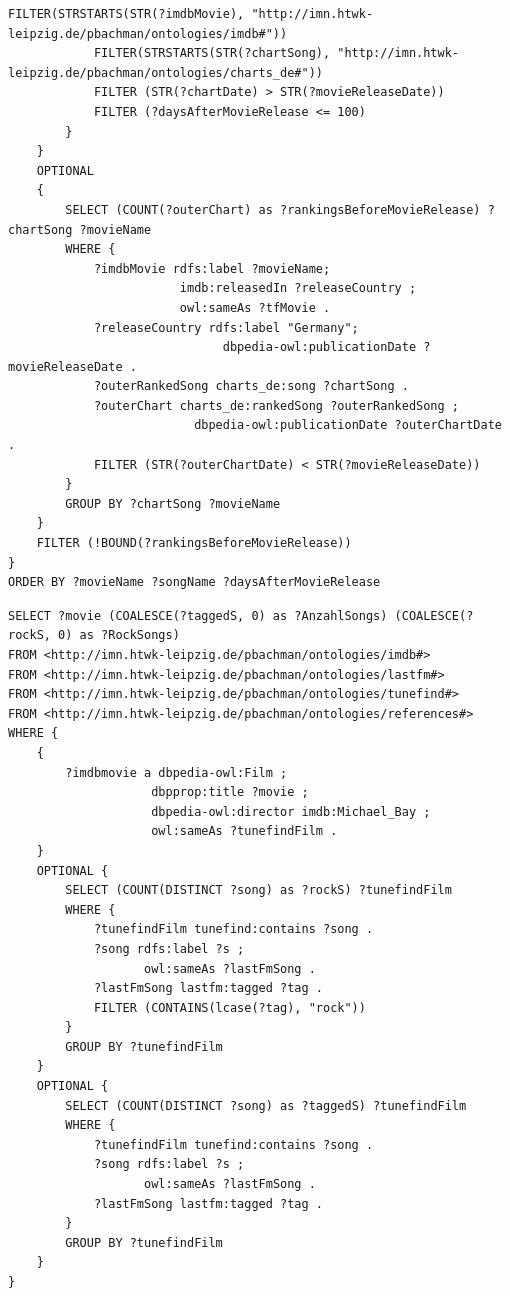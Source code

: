 \documentclass[parskip]{scrartcl}
\begin{document}
\begin{lstlisting}[caption={SPARQL-Anfrage zur Beantwortung der Recherchefragestellung}, label={lst:questionSparql}]
            FILTER(STRSTARTS(STR(?imdbMovie), "http://imn.htwk-leipzig.de/pbachman/ontologies/imdb#"))
            FILTER(STRSTARTS(STR(?chartSong), "http://imn.htwk-leipzig.de/pbachman/ontologies/charts_de#"))
            FILTER (STR(?chartDate) > STR(?movieReleaseDate))
            FILTER (?daysAfterMovieRelease <= 100)
        }
    }
    OPTIONAL 
    {
        SELECT (COUNT(?outerChart) as ?rankingsBeforeMovieRelease) ?chartSong ?movieName
        WHERE {           
            ?imdbMovie rdfs:label ?movieName;
                        imdb:releasedIn ?releaseCountry ;
                        owl:sameAs ?tfMovie .
            ?releaseCountry rdfs:label "Germany";
                              dbpedia-owl:publicationDate ?movieReleaseDate .
            ?outerRankedSong charts_de:song ?chartSong .
            ?outerChart charts_de:rankedSong ?outerRankedSong ;
                          dbpedia-owl:publicationDate ?outerChartDate .
            FILTER (STR(?outerChartDate) < STR(?movieReleaseDate))
        }
        GROUP BY ?chartSong ?movieName
    }
    FILTER (!BOUND(?rankingsBeforeMovieRelease))
}
ORDER BY ?movieName ?songName ?daysAfterMovieRelease
\end{lstlisting}


\begin{lstlisting}[caption={SPARQL-Anfrage zur Beantwortung der alternativen Recherchefragestellung}, label={lst:questionSparql2}]
SELECT ?movie (COALESCE(?taggedS, 0) as ?AnzahlSongs) (COALESCE(?rockS, 0) as ?RockSongs)
FROM <http://imn.htwk-leipzig.de/pbachman/ontologies/imdb#>
FROM <http://imn.htwk-leipzig.de/pbachman/ontologies/lastfm#>
FROM <http://imn.htwk-leipzig.de/pbachman/ontologies/tunefind#>
FROM <http://imn.htwk-leipzig.de/pbachman/ontologies/references#>
WHERE {
    {
        ?imdbmovie a dbpedia-owl:Film ;
                    dbpprop:title ?movie ;
                    dbpedia-owl:director imdb:Michael_Bay ;
                    owl:sameAs ?tunefindFilm .
    }
    OPTIONAL {
        SELECT (COUNT(DISTINCT ?song) as ?rockS) ?tunefindFilm
        WHERE {
            ?tunefindFilm tunefind:contains ?song .
            ?song rdfs:label ?s ;
                   owl:sameAs ?lastFmSong .
            ?lastFmSong lastfm:tagged ?tag .
            FILTER (CONTAINS(lcase(?tag), "rock"))
        }
        GROUP BY ?tunefindFilm
    }
    OPTIONAL {
        SELECT (COUNT(DISTINCT ?song) as ?taggedS) ?tunefindFilm
        WHERE {
            ?tunefindFilm tunefind:contains ?song .
            ?song rdfs:label ?s ;
                   owl:sameAs ?lastFmSong .
            ?lastFmSong lastfm:tagged ?tag .
        }
        GROUP BY ?tunefindFilm
    }
}
\end{lstlisting}



\end{document}
